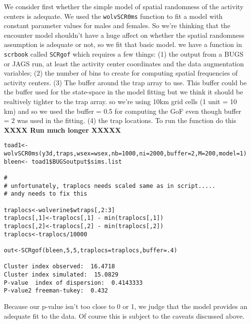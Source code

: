We consider first whether the simple model of spatial randomness of
the activity centers is adequate.  We used the \mbox{\tt wolvSCR0ms}
function to fit a model
with constant parameter values for males and females. So we're
thinking that the encounter model shouldn't have a huge affect on
whether the spatial randomness assumption is adequate or not, so we
fit that basic model.  we have a function in \mbox{\tt scrbook} called
\mbox{\tt SCRgof} which requires a few things: (1) the output from a
BUGS or JAGS run, at least the activity center coordinates and the
data augmentation variables; (2) the number of bins to create for
computing spatial frequencies of activity centers.  (3) The buffer
around the trap array to use.  This buffer could be the buffer used
for the state-space in the model fitting but we think it should be
realtively tighter to the trap array. so we're using 10km grid cells
(1 unit = 10 km) and so we used the buffer = 0.5 for computing the GoF
even though buffer = 2 was used in the fitting.  (4) the trap
locations.  To run the function do this {\bf XXXX Run much longer XXXXX}
\begin{verbatim}
toad1<-wolvSCR0ms(y3d,traps,wsex=wsex,nb=1000,ni=2000,buffer=2,M=200,model=1)
bleen<- toad1$BUGSoutput$sims.list

#
# unfortunately, traplocs needs scaled same as in script.....
# andy needs to fix this

traplocs<-wolverine$wtraps[,2:3]
traplocs[,1]<-traplocs[,1] - min(traplocs[,1])
traplocs[,2]<-traplocs[,2] - min(traplocs[,2])
traplocs<-traplocs/10000 

out<-SCRgof(bleen,5,5,traplocs=traplocs,buffer=.4)

Cluster index observed:  16.4718
Cluster index simulated:  15.0829
P-value  index of dispersion:  0.4143333
P-value2 freeman-tukey:  0.432
\end{verbatim}
Because our p-value isn't too close to 0 or 1, we judge that the model
provides an adequate fit to the data. Of course this is subject to the
caveats discussed above.


